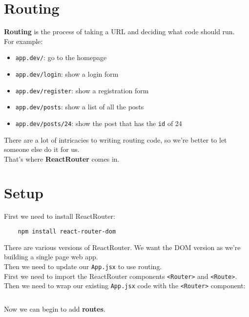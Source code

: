 \section{Routing}

\textbf{Routing} is the process of taking a URL and deciding what code should run.
\\

For example:

\begin{itemize}
    \item \texttt{app.dev/}: go to the homepage
    \item \texttt{app.dev/login}: show a login form
    \item \texttt{app.dev/register}: show a registration form
    \item \texttt{app.dev/posts}: show a list of all the posts
    \item \texttt{app.dev/posts/24}: show the post that has the \texttt{id} of 24
\end{itemize}

There are a lot of intricacies to writing routing code, so we're better to let someone else do it for us.
\\

That's where \textbf{ReactRouter} comes in.



\section{Setup}

First we need to install ReactRouter:

\begin{verbatim}
    npm install react-router-dom
\end{verbatim}

There are various versions of ReactRouter. We want the DOM version as we're building a single page web app.
\\

Then we need to update our \texttt{App.jsx} to use routing.
\\

First we need to import the ReactRouter components \texttt{<Router>} and \texttt{<Route>}. Then we need to wrap our existing \texttt{App.jsx} code with the \texttt{<Router>} component:

\inputminted{jsx}{06-router/figures/01-Router.jsx}

Now we can begin to add \textbf{routes}.


